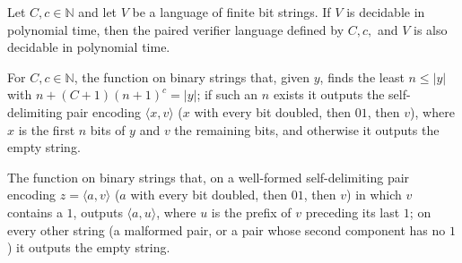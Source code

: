 \begin{lemma}
\label{Complexity.pairedVerifier_mem_P}
\leanok
{}
Let $C,c\in\mathbb{N}$ and let $V$ be a language of finite bit strings. If $V$ is
decidable in polynomial time, then the paired verifier language defined by $C,c,$ and
$V$ is also decidable in polynomial time.
\end{lemma}

\begin{definition}
\label{Complexity.verifier_split}
\leanok
{}
For $C, c \in \mathbb{N}$, the function on binary strings that, given $y$, finds
the least $n \le |y|$ with $n + (C+1)(n+1)^c = |y|$; if such an $n$ exists it
outputs the self-delimiting pair encoding $\langle x, v\rangle$ ($x$ with every
bit doubled, then $01$, then $v$), where $x$ is the first $n$ bits of $y$ and $v$
the remaining bits, and otherwise it outputs the empty string.
\end{definition}

\begin{definition}
\label{Complexity.verifier_strip}
\leanok
{}
The function on binary strings that, on a well-formed self-delimiting pair
encoding $z = \langle a, v\rangle$ ($a$ with every bit doubled, then $01$, then
$v$) in which $v$ contains a $1$, outputs $\langle a, u\rangle$, where $u$ is the
prefix of $v$ preceding its last $1$; on every other string (a malformed pair, or
a pair whose second component has no $1$) it outputs the empty string.
\end{definition}

